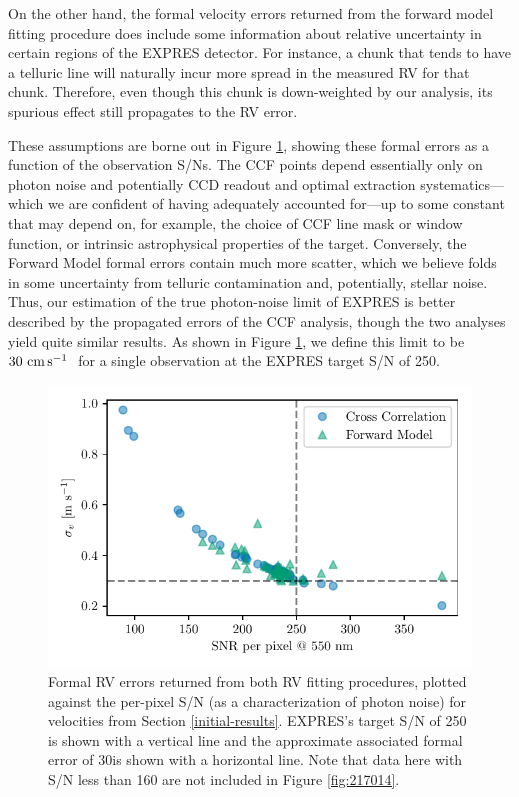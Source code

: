 On the other hand, the formal velocity errors returned from the forward model fitting procedure does include some information
about relative uncertainty in certain regions of the EXPRES detector. For instance, a chunk that tends to have a telluric line will naturally incur more spread in the measured RV for that chunk. Therefore, even though this chunk is down-weighted by our analysis, its spurious effect still propagates to the RV error.

These assumptions are borne out in Figure \ref{fig:snr}, showing these formal errors as a function of the observation S/Ns. The CCF points depend essentially only on photon noise and potentially CCD readout and optimal extraction systematics---which we are confident of having adequately accounted for---up to some constant that may depend on, for example, the choice of CCF line mask or window function, or intrinsic astrophysical properties of the target. Conversely, the Forward Model formal errors contain much more scatter, which we believe folds in some uncertainty from telluric contamination and, potentially, stellar noise. Thus, our estimation of the true photon-noise limit of EXPRES is better described by the propagated errors of the CCF analysis, though the two analyses yield quite similar results. As shown in Figure \ref{fig:snr}, we define this limit to be $30~\si{\centi\meter\per\second}~$ for a single observation at the EXPRES target S/N of 250.

\begin{figure}
    \centering
    \includegraphics[width=\textwidth]{figures-4/err_vs_snr.pdf}
    \caption[EXPRES formal radial velocity errors]{Formal RV errors returned from both RV fitting procedures, plotted against the per-pixel S/N (as a characterization of photon noise) for velocities from Section \ref{initial-results}. EXPRES's target S/N of 250 is shown with a vertical line and the approximate associated formal error of 30\cms is shown with a horizontal line. Note that data here with S/N less than 160 are not included in Figure \ref{fig:217014}.}
    \label{fig:snr}
\end{figure}

